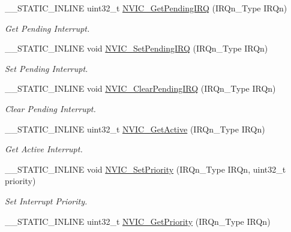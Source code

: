 \begin{DoxyCompactItemize}
\+\_\+\+\_\+\+S\+T\+A\+T\+I\+C\+\_\+\+I\+N\+L\+I\+NE uint32\+\_\+t \mbox{\hyperlink{group___c_m_s_i_s___core___n_v_i_c_functions_gafec8042db64c0f8ed432b6c8386a05d8}{N\+V\+I\+C\+\_\+\+Get\+Pending\+I\+RQ}} (I\+R\+Qn\+\_\+\+Type I\+R\+Qn)
\begin{DoxyCompactList}\small\item\em Get Pending Interrupt. \end{DoxyCompactList}\item 
\+\_\+\+\_\+\+S\+T\+A\+T\+I\+C\+\_\+\+I\+N\+L\+I\+NE void \mbox{\hyperlink{group___c_m_s_i_s___core___n_v_i_c_functions_ga3ecf446519da33e1690deffbf5be505f}{N\+V\+I\+C\+\_\+\+Set\+Pending\+I\+RQ}} (I\+R\+Qn\+\_\+\+Type I\+R\+Qn)
\begin{DoxyCompactList}\small\item\em Set Pending Interrupt. \end{DoxyCompactList}\item 
\+\_\+\+\_\+\+S\+T\+A\+T\+I\+C\+\_\+\+I\+N\+L\+I\+NE void \mbox{\hyperlink{group___c_m_s_i_s___core___n_v_i_c_functions_ga332e10ef9605dc6eb10b9e14511930f8}{N\+V\+I\+C\+\_\+\+Clear\+Pending\+I\+RQ}} (I\+R\+Qn\+\_\+\+Type I\+R\+Qn)
\begin{DoxyCompactList}\small\item\em Clear Pending Interrupt. \end{DoxyCompactList}\item 
\+\_\+\+\_\+\+S\+T\+A\+T\+I\+C\+\_\+\+I\+N\+L\+I\+NE uint32\+\_\+t \mbox{\hyperlink{group___c_m_s_i_s___core___n_v_i_c_functions_ga47a0f52794068d076c9147aa3cb8d8a6}{N\+V\+I\+C\+\_\+\+Get\+Active}} (I\+R\+Qn\+\_\+\+Type I\+R\+Qn)
\begin{DoxyCompactList}\small\item\em Get Active Interrupt. \end{DoxyCompactList}\item 
\+\_\+\+\_\+\+S\+T\+A\+T\+I\+C\+\_\+\+I\+N\+L\+I\+NE void \mbox{\hyperlink{group___c_m_s_i_s___core___n_v_i_c_functions_ga2305cbd44aaad792e3a4e538bdaf14f9}{N\+V\+I\+C\+\_\+\+Set\+Priority}} (I\+R\+Qn\+\_\+\+Type I\+R\+Qn, uint32\+\_\+t priority)
\begin{DoxyCompactList}\small\item\em Set Interrupt Priority. \end{DoxyCompactList}\item 
\+\_\+\+\_\+\+S\+T\+A\+T\+I\+C\+\_\+\+I\+N\+L\+I\+NE uint32\+\_\+t \mbox{\hyperlink{group___c_m_s_i_s___core___n_v_i_c_functions_ga1cbaf8e6abd4aa4885828e7f24fcfeb4}{N\+V\+I\+C\+\_\+\+Get\+Priority}} (I\+R\+Qn\+\_\+\+Type I\+R\+Qn)

\end{DoxyCompactItemize}
